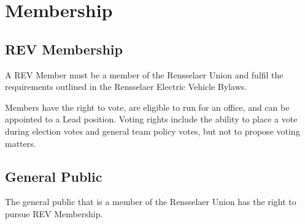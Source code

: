 \section{Membership}
\label{membership}

\subsection{REV Membership}
\label{membership:rev}
A REV Member must be a member of the Rensselaer Union and fulfil the requirements outlined in the Rensselaer Electric Vehicle Bylaws.

Members have the right to vote, are eligible to run for an office, and can be appointed to a Lead position. Voting rights include the ability to place a vote during election votes and general team policy votes, but not to propose voting matters.

\subsection{General Public}
\label{membership:general}

The general public that is a member of the Rensselaer Union has the right to pursue REV Membership.